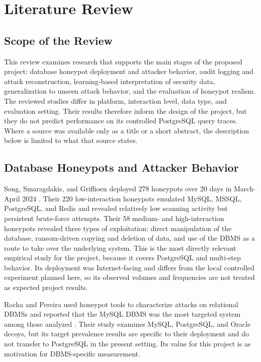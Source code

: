 \documentclass[12pt,a4paper]{report}
\begin{document}
\chapter{Literature Review}

\section{Scope of the Review}
This review examines research that supports the main stages of the proposed project: database honeypot deployment and attacker behavior, audit logging and attack reconstruction, learning-based interpretation of security data, generalization to unseen attack behavior, and the evaluation of honeypot realism. The reviewed studies differ in platform, interaction level, data type, and evaluation setting. Their results therefore inform the design of the project, but they do not predict performance on its controlled PostgreSQL query traces. Where a source was available only as a title or a short abstract, the description below is limited to what that source states.

\section{Database Honeypots and Attacker Behavior}
Song, Smaragdakis, and Griffioen deployed 278 honeypots over 20 days in March--April 2024 \cite{song_decoy_2025}. Their 220 low-interaction honeypots emulated MySQL, MSSQL, PostgreSQL, and Redis and revealed relatively low scanning activity but persistent brute-force attempts. Their 58 medium- and high-interaction honeypots revealed three types of exploitation: direct manipulation of the database, ransom-driven copying and deletion of data, and use of the DBMS as a route to take over the underlying system. This is the most directly relevant empirical study for the project, because it covers PostgreSQL and multi-step behavior. Its deployment was Internet-facing and differs from the local controlled experiment planned here, so its observed volumes and frequencies are not treated as expected project results.

Rocha and Pereira used honeypot tools to characterize attacks on relational DBMSs and reported that the MySQL DBMS was the most targeted system among those analyzed \cite{rocha_what_2025}. Their study examines MySQL, PostgreSQL, and Oracle decoys, but its target prevalence results are specific to their deployment and do not transfer to PostgreSQL in the present setting. Its value for this project is as motivation for DBMS-specific measurement.
\end{document}
